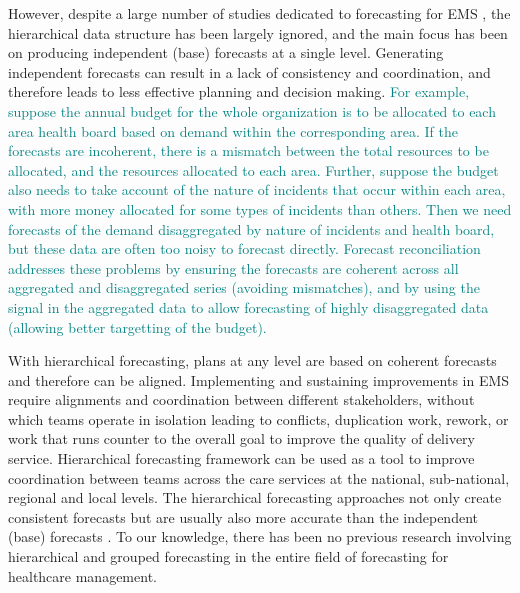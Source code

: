 \documentclass[
  authoryear,
  preprint,
  3p]{elsarticle}
\begin{document}
However, despite a large number of studies dedicated to forecasting for
EMS
\citep{mingliterature2022, gul2020exhaustive, ibrahim2016modeling, wargon2009systematic},
the hierarchical data structure has been largely ignored, and the main
focus has been on producing independent (base) forecasts at a single
level. Generating independent forecasts can result in a lack of
consistency and coordination, and therefore leads to less effective
planning and decision making.
\textcolor{teal}{For example, suppose the annual budget for the whole organization is to be allocated to each area health board based on demand within the corresponding area. If the forecasts are incoherent, there is a mismatch between the total resources to be allocated, and the resources allocated to each area. Further, suppose the budget also needs to take account of the nature of incidents that occur within each area, with more money allocated for some types of incidents than others. Then we need forecasts of the demand disaggregated by nature of incidents and health board, but these data are often too noisy to forecast directly. Forecast reconciliation addresses these problems by ensuring the forecasts are coherent across all aggregated and disaggregated series (avoiding mismatches), and by using the signal in the aggregated data to allow forecasting of highly disaggregated data (allowing better targetting of the budget).}

With hierarchical forecasting, plans at any level are based on coherent
forecasts and therefore can be aligned. Implementing and sustaining
improvements in EMS require alignments and coordination between
different stakeholders, without which teams operate in isolation leading
to conflicts, duplication work, rework, or work that runs counter to the
overall goal to improve the quality of delivery service. Hierarchical
forecasting framework can be used as a tool to improve coordination
between teams across the care services at the national, sub-national,
regional and local levels. The hierarchical forecasting approaches not
only create consistent forecasts but are usually also more accurate than
the independent (base) forecasts \citep{hyndman2011optimal}. To our
knowledge, there has been no previous research involving hierarchical
and grouped forecasting in the entire field of forecasting for
healthcare management.
\end{document}
